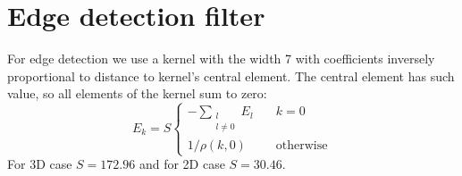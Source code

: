 \documentclass[1p]{elsarticle}
\begin{document}
\section{Edge detection filter}
\label{sec:filter}
For edge detection we use a kernel with the width 7 with coefficients inversely
proportional to distance to kernel's central element. The central element has
such value, so all elements of the kernel sum to zero:
\begin{equation}
  E_k = S \left\{
  \begin{array}{ll}
    -\sum\limits_{\substack{l \\ l \ne 0}} E_l & \quad k = 0 \\
    1 / \rho(k, 0) & \quad \text{otherwise}
  \end{array}
  \right.
\end{equation}
For 3D case $S=172.96$ and for 2D case $S=30.46$.


\end{document}
